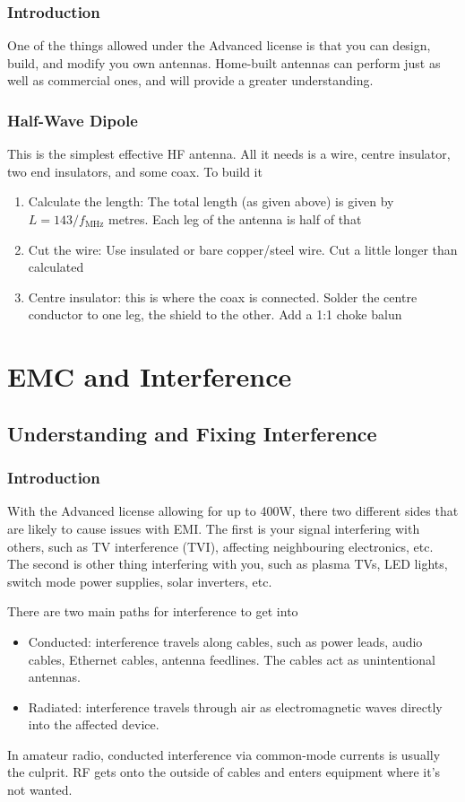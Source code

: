 \documentclass{article}
\begin{document}
\subsubsection{Introduction}
One of the things allowed under the Advanced license is that you can design, build, and modify you own antennas. Home-built antennas can perform just as well as commercial ones, and will provide a greater understanding.

\subsubsection{Half-Wave Dipole}
This is the simplest effective HF antenna. All it needs is a wire, centre insulator, two end insulators, and some coax. To build it
\begin{enumerate}
    \item Calculate the length: The total length (as given above) is given by $L=143/f_{\text{MHz}}$ metres. Each leg of the antenna is half of that
    \item Cut the wire: Use insulated or bare copper/steel wire. Cut a little longer than calculated
    \item Centre insulator: this is where the coax is connected. Solder the centre conductor to one leg, the shield to the other. Add a 1:1 choke balun
\end{enumerate}

\section{EMC and Interference}
\subsection{Understanding and Fixing Interference}
\subsubsection{Introduction}
With the Advanced license allowing for up to 400W, there two different sides that are likely to cause issues with EMI. The first is your signal interfering with others, such as TV interference (TVI), affecting neighbouring electronics, etc. The second is other thing interfering with you, such as plasma TVs, LED lights, switch mode power supplies, solar inverters, etc.

There are two main paths for interference to get into
\begin{itemize}
    \item Conducted: interference travels along cables, such as power leads, audio cables, Ethernet cables, antenna feedlines. The cables act as unintentional antennas.
    \item Radiated: interference travels through air as electromagnetic waves directly into the affected device.
\end{itemize}
In amateur radio, conducted interference via common-mode currents is usually the culprit. RF gets onto the outside of cables and enters equipment where it's not wanted.
\end{document}
